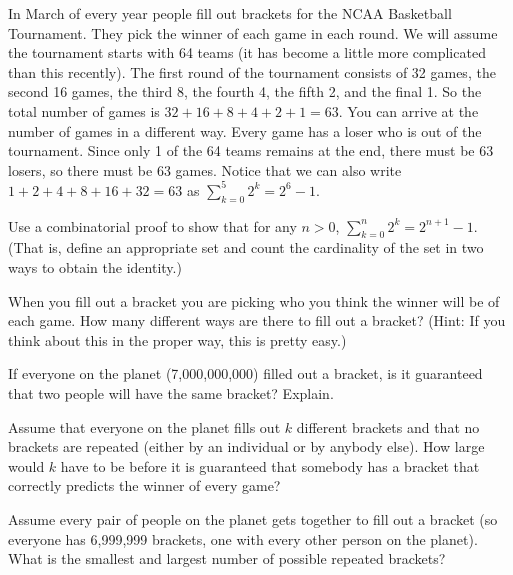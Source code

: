\begin{pro}
In March of every year people fill out brackets for the NCAA Basketball Tournament. They pick the
winner of each game in each round.  We will assume the tournament starts with 64 teams 
(it has become a little more complicated than this recently).
The first round of the tournament consists of 32 games, 
the second 16 games, the third 8, the fourth 4, the fifth 2, and the final 1.  
So the total number of games is $32+16+8+4+2+1=63$.
You can arrive at the number of games in a different way. Every game has a loser who is
out of the tournament.  Since only 1 of the 64 teams remains at the end, there must be 63 losers,
so there must be 63 games.
Notice that we can also write $1+2+4+8+16+32=63$ as ${\displaystyle\sum_{k=0}^5 2^k=2^6-1}$.
\begin{lenum}
\item 
Use a combinatorial proof to show that for any $n>0$, ${\displaystyle\sum_{k=0}^n 2^k=2^{n+1}-1}$.
(That is, define an appropriate set and count the cardinality of the set in two ways to
obtain the identity.)
\item
When you fill out a bracket you are picking who you think the winner will be of each game.  
How many different ways are there to fill out a bracket? 
(Hint: If you think about this in the proper way, this is pretty easy.)
\item
If everyone on the planet (7,000,000,000) filled out a bracket, is it guaranteed that 
two people will have the same bracket?  Explain.
\item
Assume that everyone on the planet fills out $k$ different brackets and that no brackets are
repeated (either by an individual or by anybody else).  How large would $k$ have to be before 
it is guaranteed that somebody has a bracket that correctly predicts the winner of every game?
\item
Assume every pair of people on the planet gets together to fill out a bracket (so everyone has 
6,999,999 brackets, one with every other person on the planet).  What is the smallest and largest 
number of possible repeated brackets?
\end{lenum}
\end{pro}
